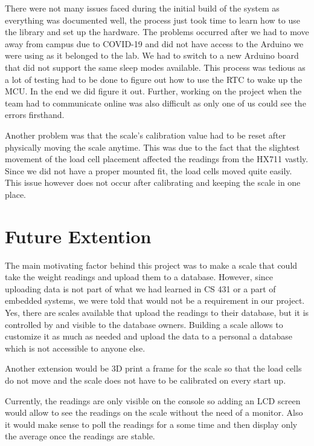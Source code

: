 \documentclass[10pt]{article}
\begin{document}
{There were not many issues faced during the initial build of the system as everything was documented well, the process just took time to learn how to use the library and set up the hardware. The problems occurred after we had to move away from campus due to COVID-19 and did not have access to the Arduino we were using as it belonged to the lab. We had to switch to a new Arduino board that did not support the same sleep modes available. This process was tedious as a lot of testing had to be done to figure out how to use the RTC to wake up the MCU. In the end we did figure it out. Further, working on the project when the team had to communicate online was also difficult as only one of us could see the errors firsthand.

Another problem was that the scale's calibration value had to be reset after physically moving the scale anytime. This was due to the fact that the slightest movement of the load cell placement affected the readings from the HX711 vastly. Since we did not have a proper mounted fit, the load cells moved quite easily. This issue however does not occur after calibrating and keeping the scale in one place.
\par}


{\Large \section{Future Extention} \par}
{\large
The main motivating factor behind this project was to make a scale that could take the weight readings and upload them to a database. However, since uploading data is not part of what we had learned in CS 431 or a part of embedded systems, we were told that would not be a requirement in our project. Yes, there are scales available that upload the readings to their database, but it is controlled by and visible to the database owners. Building a scale allows to customize it as much as needed and upload the data to a personal a database which is not accessible to anyone else.

Another extension would be 3D print a frame for the scale so that the load cells do not move and the scale does not have to be calibrated on every start up.

Currently, the readings are only visible on the console so adding an LCD screen would allow to see the readings on the scale without the need of a monitor. Also it would make sense to poll the readings for a some time and then display only the average once the readings are stable.



\par}



\end{document}
